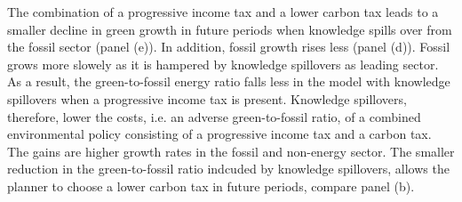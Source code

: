
 
The combination of a progressive income tax and a lower carbon tax leads to a smaller decline in green growth in future periods when knowledge spills over from the fossil sector (panel (e)). In addition, fossil growth rises less (panel (d)). Fossil grows more slowely as it is hampered by knowledge spillovers as leading sector. As a result, the green-to-fossil energy ratio falls less in the model with knowledge spillovers when a progressive income tax is present. Knowledge spillovers, therefore, lower the costs, i.e. an adverse green-to-fossil ratio, of a combined environmental policy consisting of a progressive income tax and a carbon tax. The gains are higher growth rates in the fossil and non-energy sector.
The smaller reduction in the green-to-fossil ratio indcuded by knowledge spillovers, allows the planner to choose a lower carbon tax in future periods, compare panel (b).


